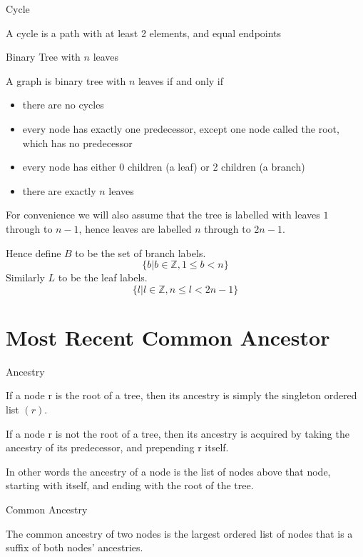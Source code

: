 \documentclass[10pt,a4paper]{report}
\begin{document}
\begin{definition} Cycle

	A cycle is a path with at least 2 elements, and equal endpoints
\end{definition}

\begin{definition} Binary Tree with $n$ leaves

	A graph is binary tree with $n$ leaves if and only if
	\begin{itemize}
		\item there are no cycles
		\item every node has exactly one predecessor, except one node called
			the root, which has no predecessor
		\item every node has either 0 children (a leaf) or 2 children
			(a branch)
		\item there are exactly $n$ leaves
	\end{itemize}
\end{definition}

For convenience we will also assume that the tree is labelled with leaves $1$
through to $n-1$, hence leaves are labelled $n$ through to $2n-1$.

Hence define $B$ to be the set of branch labels.
\[\{b | b \in \mathds{Z}, 1 \leq b < n\}\]
Similarly $L$ to be the leaf labels.
\[\{l | l \in \mathds{Z}, n \leq l < 2n-1\}\]

\section{Most Recent Common Ancestor}

\begin{definition} Ancestry

	If a node r is the root of a tree, then its ancestry is simply the
	singleton ordered list $(r)$.

	If a node r is not the root of a tree, then its ancestry is acquired by
	taking the ancestry of its predecessor, and prepending r itself.

	In other words the ancestry of a node is the list of nodes above that node,
	starting with itself, and ending with the root of the tree.
\end{definition}

\begin{definition} Common Ancestry

	The common ancestry of two nodes is the largest ordered list of nodes that
	is a suffix of both nodes' ancestries.
\end{definition}
\end{document}
